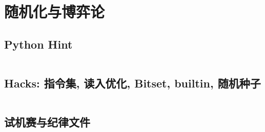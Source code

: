 \section{随机化与博弈论}
				\subsection{Python Hint}
					\inputminted{python}{sections/RandomizationAndGameTheory/assets/Miscellany/py.py}
				\subsection{Hacks: 指令集, 读入优化, Bitset, builtin, 随机种子}
					\inputminted[highlightlines={2,4,11,13,17}]{cpp}{sections/RandomizationAndGameTheory/assets/Miscellany/hack.cpp}
				\subsection{试机赛与纪律文件}
				\begin{spacing}{0.3}
					
				\end{spacing}
				
				\inputminted{sh}{sections/RandomizationAndGameTheory/assets/Miscellany/bashrc}
